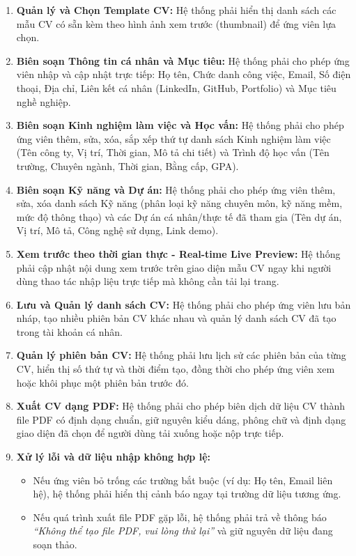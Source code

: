 \begin{enumerate}[label=\bfseries REQ-CV-\arabic*:, leftmargin=2.5cm]
    \item \textbf{Quản lý và Chọn Template CV:} Hệ thống phải hiển thị danh sách các mẫu CV có sẵn kèm theo hình ảnh xem trước (thumbnail) để ứng viên lựa chọn.
    \item \textbf{Biên soạn Thông tin cá nhân và Mục tiêu:} Hệ thống phải cho phép ứng viên nhập và cập nhật trực tiếp: Họ tên, Chức danh công việc, Email, Số điện thoại, Địa chỉ, Liên kết cá nhân (LinkedIn, GitHub, Portfolio) và Mục tiêu nghề nghiệp.
    \item \textbf{Biên soạn Kinh nghiệm làm việc và Học vấn:} Hệ thống phải cho phép ứng viên thêm, sửa, xóa, sắp xếp thứ tự danh sách Kinh nghiệm làm việc (Tên công ty, Vị trí, Thời gian, Mô tả chi tiết) và Trình độ học vấn (Tên trường, Chuyên ngành, Thời gian, Bằng cấp, GPA).
    \item \textbf{Biên soạn Kỹ năng và Dự án:} Hệ thống phải cho phép ứng viên thêm, sửa, xóa danh sách Kỹ năng (phân loại kỹ năng chuyên môn, kỹ năng mềm, mức độ thông thạo) và các Dự án cá nhân/thực tế đã tham gia (Tên dự án, Vị trí, Mô tả, Công nghệ sử dụng, Link demo).
    \item \textbf{Xem trước theo thời gian thực - Real-time Live Preview:} Hệ thống phải cập nhật nội dung xem trước trên giao diện mẫu CV ngay khi người dùng thao tác nhập liệu trực tiếp mà không cần tải lại trang.
    \item \textbf{Lưu và Quản lý danh sách CV:} Hệ thống phải cho phép ứng viên lưu bản nháp, tạo nhiều phiên bản CV khác nhau và quản lý danh sách CV đã tạo trong tài khoản cá nhân.
    \item \textbf{Quản lý phiên bản CV:} Hệ thống phải lưu lịch sử các phiên bản của từng CV, hiển thị số thứ tự và thời điểm tạo, đồng thời cho phép ứng viên xem hoặc khôi phục một phiên bản trước đó.
    \item \textbf{Xuất CV dạng PDF:} Hệ thống phải cho phép biên dịch dữ liệu CV thành file PDF có định dạng chuẩn, giữ nguyên kiểu dáng, phông chữ và định dạng giao diện đã chọn để người dùng tải xuống hoặc nộp trực tiếp.
    \item \textbf{Xử lý lỗi và dữ liệu nhập không hợp lệ:}
    \begin{itemize}
        \item Nếu ứng viên bỏ trống các trường bắt buộc (ví dụ: Họ tên, Email liên hệ), hệ thống phải hiển thị cảnh báo ngay tại trường dữ liệu tương ứng.
        \item Nếu quá trình xuất file PDF gặp lỗi, hệ thống phải trả về thông báo \textit{\textquotedblleft Không thể tạo file PDF, vui lòng thử lại\textquotedblright} và giữ nguyên dữ liệu đang soạn thảo.

\end{itemize}
\end{enumerate}
